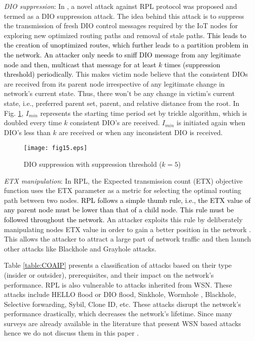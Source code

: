 \documentclass[10pt,journal,sort & compress]{IEEEtran}
\begin{document}
\textit{DIO suppression}: In \cite{Perazzo2017}, a novel attack against RPL protocol was proposed and termed as a DIO suppression attack. The idea behind this attack is to suppress the transmission of fresh DIO control messages required by the IoT nodes for exploring new optimized routing paths and removal of stale paths. \textcolor{black}{This leads to the creation of unoptimized routes, which further leads to a partition problem in the network. An attacker only needs to sniff DIO message from any legitimate node and then, multicast that message for at least $ k $ times (suppression threshold) periodically.} This makes victim node believe that the consistent DIOs \cite{levis2011trickle} are received from its parent node irrespective of any legitimate change in network's current state. Thus, there won't be any change in victim's current state, i.e., preferred parent set, parent, and relative distance from the root. In Fig. \ref{DIOSuppression}, $ I_{min} $ represents the starting time period set by trickle algorithm, which is doubled every time $ k $ consistent DIO's are received. $ I_{min} $ is initiated again when DIO's less than $ k  $ are received or when any inconsistent DIO is received.           

\begin{figure}[!h]
	\centering
	\texttt{[image: fig15.eps]}
	\caption{DIO suppression with suppression threshold ($ k=5 $)\cite{Perazzo2017}}
	\label{DIOSuppression}
\end{figure}



\textit{ETX manipulation}: In RPL, the Expected transmission count (ETX) objective function uses the ETX parameter as a metric for selecting the optimal routing path between two nodes. \textcolor{black}{RPL follows a simple thumb rule, i.e., the ETX value of any parent node must be lower than that of a child node. This rule must be followed throughout the network.} An attacker exploits this rule by deliberately manipulating nodes ETX value in order to gain a better position in the network \cite{Shreenivas2017}. This allows the attacker to attract a large part of network traffic and then launch other attacks like Blackhole and Grayhole attacks.   


Table \ref{table:COAIP} presents a classification of attacks based on their type (insider or outsider), prerequisites, and their impact on the network's performance. RPL is also vulnerable to attacks inherited from WSN. These attacks include HELLO flood or DIO flood, Sinkhole, Wormhole \cite{deshmukh2019real}, Blackhole, Selective forwarding, Sybil, Clone ID, etc. These attacks disrupt the network's performance drastically, which decreases the network's lifetime. Since many surveys are already available in the literature that present WSN based attacks hence we do not discuss them in this paper \cite{karlof2003secure, bhushan2018recent}.
\end{document}
